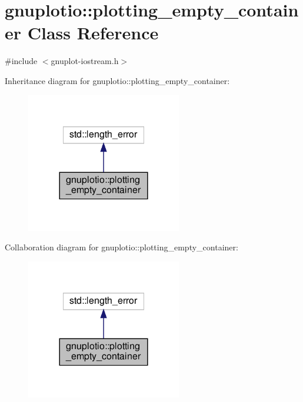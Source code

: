 \hypertarget{classgnuplotio_1_1plotting__empty__container}{}\section{gnuplotio\+:\+:plotting\+\_\+empty\+\_\+container Class Reference}
\label{classgnuplotio_1_1plotting__empty__container}


{\ttfamily \#include $<$gnuplot-\/iostream.\+h$>$}



Inheritance diagram for gnuplotio\+:\+:plotting\+\_\+empty\+\_\+container\+:
\nopagebreak
\begin{figure}[H]
\begin{center}
\leavevmode
\includegraphics[width=192pt]{classgnuplotio_1_1plotting__empty__container__inherit__graph}
\end{center}
\end{figure}


Collaboration diagram for gnuplotio\+:\+:plotting\+\_\+empty\+\_\+container\+:
\nopagebreak
\begin{figure}[H]
\begin{center}
\leavevmode
\includegraphics[width=192pt]{classgnuplotio_1_1plotting__empty__container__coll__graph}
\end{center}
\end{figure}
